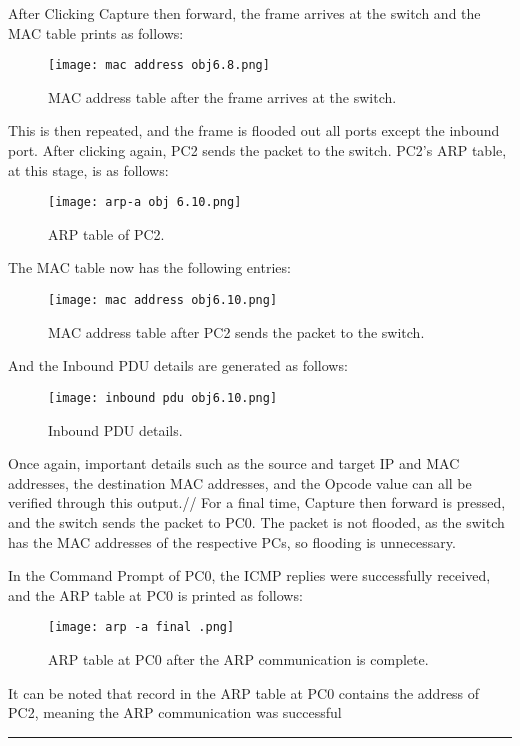 \documentclass[a4paper,12pt]{article}
\begin{document}
After Clicking Capture then forward, the frame arrives at the switch and the MAC table prints as follows:
\begin{figure}[H]
\centering
\texttt{[image: mac address obj6.8.png]}
\caption{MAC address table after the frame arrives at the switch.}
\end{figure}

This is then repeated, and the frame is flooded out all ports except the inbound port. After clicking again, PC2 sends the packet to the switch. PC2's ARP table, at this stage, is as follows:
\begin{figure}[H]
\centering
\texttt{[image: arp-a obj 6.10.png]}
\caption{ARP table of PC2.}
\end{figure}
\pagebreak
The MAC table now has the following entries:
\begin{figure}[H]
\centering
\texttt{[image: mac address obj6.10.png]}
\caption{MAC address table after PC2 sends the packet to the switch.}
\end{figure}

And the Inbound PDU details are generated as follows:
\begin{figure}[H]
\centering
\texttt{[image: inbound pdu obj6.10.png]}
\caption{Inbound PDU details.}
\end{figure}

Once again, important details such as the source and target IP and MAC addresses, the destination MAC addresses, and the Opcode value can all be verified through this output.//
For a final time, Capture then forward is pressed, and the switch sends the packet to PC0. The packet is not flooded, as the switch has the MAC addresses of the respective PCs, so flooding is unnecessary.

In the Command Prompt of PC0, the ICMP replies were successfully received, and the ARP table at PC0 is printed as follows:
\begin{figure}[H]
\centering
\texttt{[image: arp -a final .png]}
\caption{ARP table at PC0 after the ARP communication is complete.}
\end{figure}

It can be noted that record in the ARP table at PC0 contains the address of PC2, meaning the ARP communication was successful

\vspace{1em}
\hrule
\vspace{0.5em}
\pagebreak
\end{document}
